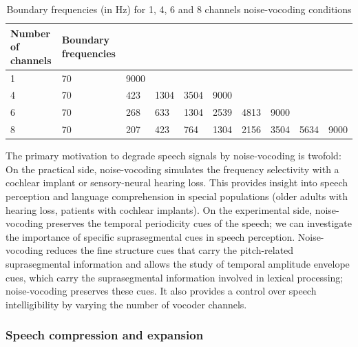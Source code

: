 \documentclass[a4paper, nobind]{templates/ociamthesis}
\begin{document}
\begin{table}[H]
\begin{center}
\tiny
\caption{Boundary frequencies (in Hz) for 1, 4, 6 and 8 channels noise-vocoding conditions} 
\label{frequencies} 
\vskip 0.12in
\begin{tabular}{llllllllll} 
\hline
Number of channels     &    Boundary frequencies \\
\hline
1   &   70    &   9000   &     &     &       &       &        &       &   \\

4   &   70    &   423   &   1304  &   3504  &   9000    &       &        &       &   \\

6   &   70    &   268   &   633   &   1304  &   2539    &   4813    &    9000    &       &   \\

8   &   70    &   207   &   423   &   764   &   1304    &   2156    &    3504    &   5634    &   9000\\
\hline
\end{tabular} 
\end{center} 
\end{table}

The primary motivation to degrade speech signals by noise-vocoding is twofold:
On the practical side, noise-vocoding simulates the frequency selectivity with a cochlear implant or sensory-neural hearing loss.
This provides insight into speech perception and language comprehension in special populations (older adults with hearing loss, patients with cochlear implants).
On the experimental side, noise-vocoding preserves the temporal periodicity cues of the speech;
we can investigate the importance of specific suprasegmental cues in speech perception.
Noise-vocoding reduces the fine structure cues that carry the pitch-related suprasegmental information
and allows the study of temporal amplitude envelope cues, which carry the suprasegmental information involved in lexical processing;
noise-vocoding preserves these cues.
It also provides a control over speech intelligibility by varying the number of vocoder channels.

\hypertarget{compression-expansion}{%
\subsubsection{Speech compression and expansion}\label{compression-expansion}}
\end{document}
